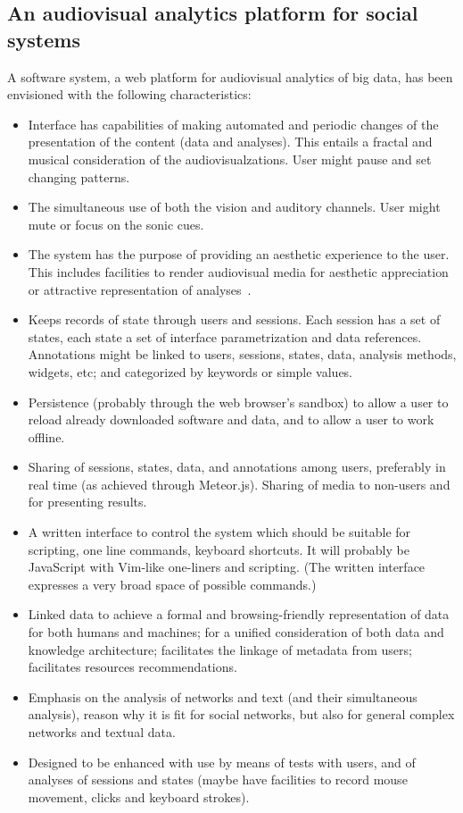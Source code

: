 \documentclass[letterpaper,10pt]{article}
\begin{document}
\subsection{An audiovisual analytics platform for social systems}\label{sys}
A software system, a web platform for audiovisual analytics of big data,
has been envisioned with the following characteristics:
\begin{itemize}
  \item Interface has capabilities of making automated and periodic changes of
	  the presentation of the content (data and analyses).
		This entails a fractal and musical consideration
		of the audiovisualzations.
		User might pause and set changing patterns.
  \item The simultaneous use of both the vision and auditory channels.
	  User might mute or focus on the sonic cues.
  \item The system has the purpose of providing an aesthetic experience
	  to the user.
		This includes facilities to render audiovisual media
		for aesthetic appreciation or attractive representation of
		analyses~\cite{tufte}.
  \item Keeps records of state through users and sessions.
	  Each session has a set of states, each state a set
		of interface parametrization and data references.
	Annotations might be linked to users, sessions, states, data,
		analysis methods, widgets, etc; and categorized
		by keywords or simple values.
  \item Persistence (probably through the web browser's sandbox)
	  to allow a user to reload already downloaded software
		and data,
		and to allow a user to work offline.
  \item Sharing of sessions, states, data, and annotations among users,
	  preferably in real time (as achieved through Meteor.js).
		Sharing of media to non-users and for presenting results.
  \item A written interface to control the system which should be
	  suitable for scripting, one line commands, keyboard shortcuts.
		It will probably be JavaScript with Vim-like one-liners and scripting.
		(The written interface expresses a very broad space
		of possible commands.)
  \item Linked data to achieve a formal and browsing-friendly representation of data for both humans and machines;
	  for a unified consideration of both data and knowledge architecture;
facilitates the linkage of metadata from users;
facilitates resources recommendations.
  \item Emphasis on the analysis of networks and text (and their simultaneous analysis),
	  reason why it is fit for social networks, but also for general complex networks
		and textual data.
  \item Designed to be enhanced with use by means of tests with users,
	  and of analyses of sessions and states
	  (maybe have facilities to record mouse movement, clicks and keyboard strokes).
\end{itemize}
\end{document}
